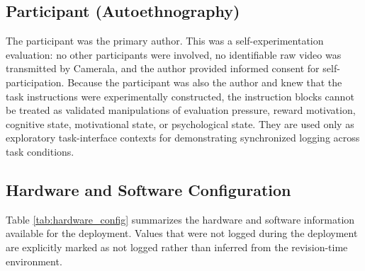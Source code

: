 \documentclass[dvipdfmx]{ehis}
\begin{document}
\subsection{Participant (Autoethnography)}
The participant was the primary author.
This was a self-experimentation evaluation: no other participants were involved, no identifiable raw video was transmitted by Camerala, and the author provided informed consent for self-participation.
Because the participant was also the author and knew that the task instructions were experimentally constructed, the instruction blocks cannot be treated as validated manipulations of evaluation pressure, reward motivation, cognitive state, motivational state, or psychological state.
They are used only as exploratory task-interface contexts for demonstrating synchronized logging across task conditions.

\subsection{Hardware and Software Configuration}
Table \ref{tab:hardware_config} summarizes the hardware and software information available for the deployment.
Values that were not logged during the deployment are explicitly marked as not logged rather than inferred from the revision-time environment.
\end{document}
